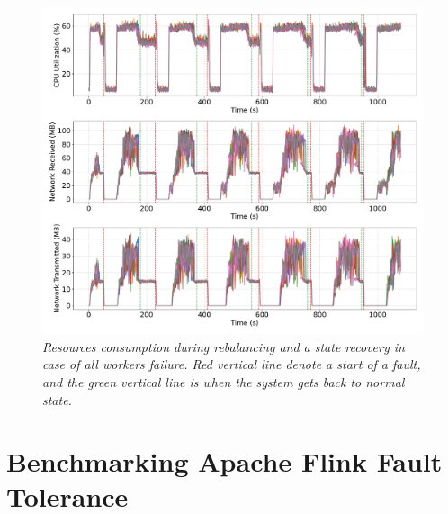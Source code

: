 \begin{figure}[ht]
    \centering
    \includegraphics[width=1\textwidth]{figures/kstreams-8pods/kafka_8_pods_resources}
    \caption{\textit{Resources consumption during rebalancing and a state recovery in case of all workers failure.
    Red vertical line denote a start of a fault, and the green vertical line is when the system gets back to normal state.}}
    \label{fig:kafka-8pods-resource}
\end{figure}



\newpage
\section{Benchmarking Apache Flink Fault Tolerance}\label{sec:benchmarking-apache-flink-fault-tolerance}

